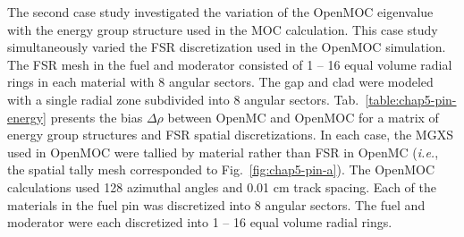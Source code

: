 The second case study investigated the variation of the OpenMOC eigenvalue with the energy group structure used in the \ac{MOC} calculation. This case study simultaneously varied the \ac{FSR} discretization used in the OpenMOC simulation. The \ac{FSR} mesh in the fuel and moderator consisted of 1 -- 16 equal volume radial rings in each material with 8 angular sectors. The gap and clad were modeled with a single radial zone subdivided into 8 angular sectors. Tab.~\ref{table:chap5-pin-energy} presents the bias $\Delta\rho$ between OpenMC and OpenMOC for a matrix of energy group structures and \ac{FSR} spatial discretizations. In each case, the \ac{MGXS} used in OpenMOC were tallied by material rather than \ac{FSR} in OpenMC (\textit{i.e.}, the spatial tally mesh corresponded to Fig.~\ref{fig:chap5-pin-a}). The OpenMOC calculations used 128 azimuthal angles and 0.01 cm track spacing. Each of the materials in the fuel pin was discretized into 8 angular sectors. The fuel and moderator were each discretized into 1 -- 16 equal volume radial rings. 

